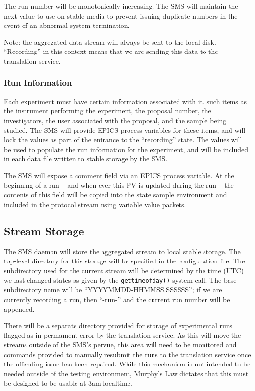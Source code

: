 The run number will be monotonically increasing. The SMS will maintain
the next value to use on stable media to prevent issuing duplicate numbers
in the event of an abnormal system termination.

\addvspace{\baselineskip}
\noindent
Note: the aggregated data stream will always be sent to the local disk.
``Recording'' in this context means that we are sending this data to the
translation service.

\subsubsection{Run Information}

Each experiment must have certain information associated with it, such items as
the instrument performing the experiment, the proposal number, the
investigators, the user associated with the proposal, and the sample being
studied. The SMS will provide EPICS process variables for these items, and will
lock the values as part of the entrance to the ``recording'' state. The values
will be used to populate the run information for the experiment, and will be
included in each data file written to stable storage by the SMS.

The SMS will expose a comment field via an EPICS process variable. At
the beginning of a run -- and when ever this PV is updated during the run --
the contents of this field will be copied into the state sample environment
and included in the protocol stream using variable value packets.


\subsection{Stream Storage}
\label{sec:storage}

The SMS daemon will store the aggregated stream to local stable storage. The
top-level directory for this storage will be specified in the configuration
file.  The subdirectory used for the current stream will be determined by the
time (UTC) we last changed states as given by the {\tt gettimeofday()} system
call. The base subdirectory name will be ``YYYYMMDD-HHMMSS.SSSSSS''; if we are
currently recording a run, then ``-run-'' and the current run number will be
appended.

There will be a separate directory provided for storage of experimental runs
flagged as in permament error by the translation service. As this will move the
streams outside of the SMS's pervue, this area will need to be monitored and
commands provided to manually resubmit the runs to the translation service once
the offending issue has been repaired. While this mechanism is not intended to
be needed outside of the testing environment, Murphy's Law dictates that this
must be designed to be usable at 3am localtime.

